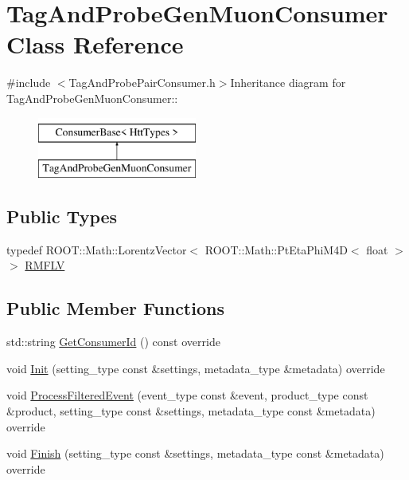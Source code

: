 \hypertarget{classTagAndProbeGenMuonConsumer}{
\section{TagAndProbeGenMuonConsumer Class Reference}
\label{classTagAndProbeGenMuonConsumer}
}


{\ttfamily \#include $<$TagAndProbePairConsumer.h$>$}Inheritance diagram for TagAndProbeGenMuonConsumer::\begin{figure}[H]
\begin{center}
\leavevmode
\includegraphics[height=2cm]{classTagAndProbeGenMuonConsumer}
\end{center}
\end{figure}
\subsection*{Public Types}
\begin{DoxyCompactItemize}
\item 
typedef ROOT::Math::LorentzVector$<$ ROOT::Math::PtEtaPhiM4D$<$ float $>$ $>$ \hyperlink{classTagAndProbeGenMuonConsumer_a9d0961398ed938ff6169fabc39c6393d}{RMFLV}
\end{DoxyCompactItemize}
\subsection*{Public Member Functions}
\begin{DoxyCompactItemize}
\item 
std::string \hyperlink{classTagAndProbeGenMuonConsumer_a06be15366a26bb5e4bbdc81bb72094aa}{GetConsumerId} () const override
\item 
void \hyperlink{classTagAndProbeGenMuonConsumer_aab29f635021f3f1685b91c7a0fe1cb73}{Init} (setting\_\-type const \&settings, metadata\_\-type \&metadata) override
\item 
void \hyperlink{classTagAndProbeGenMuonConsumer_adf99bf50f63088f944c9f74e17afed6d}{ProcessFilteredEvent} (event\_\-type const \&event, product\_\-type const \&product, setting\_\-type const \&settings, metadata\_\-type const \&metadata) override
\item 
void \hyperlink{classTagAndProbeGenMuonConsumer_a0ad1d7b73164dbdbe2803022bc364ea4}{Finish} (setting\_\-type const \&settings, metadata\_\-type const \&metadata) override
\end{DoxyCompactItemize}


